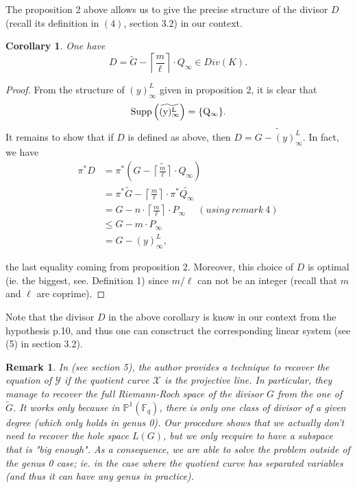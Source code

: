 \documentclass[10pt]{article}
\newtheorem{coro1}{Corollary}[]
\newtheorem{rq1}{Remark}[]
\newcommand{\s}{\vspace{0.3cm}}
\newcommand{\cd}{\cdot}
\newcommand{\fq}{\mathbb{F}_q}
\newcommand{\X}{\mathcal{X}}
\newcommand{\Y}{\mathcal{Y}}
\begin{document}
\s

The proposition 2 above allows us to give the precise structure of the divisor $D$ (recall its definition in $(4)$, section 3.2) in our context.

\s

\begin{coro1}
One have
\[D = \tilde{G} - \left\lceil\frac{m}{\ell}\right\rceil \cd Q_{\infty} \in Div(K).\]
\end{coro1}

\s

\begin{proof}
From the structure of $(y)^L_{\infty}$ given in proposition 2, it is clear that 
\[\rm{Supp}\left(\widetilde{(y)^L_{\infty}}\right) = \{Q_{\infty}\}.\]
It remains to show that if $D$ is defined as above, then $D = \widetilde{G - (y)^L_{\infty}}$. In fact, we have
\begin{align*}
\pi^*D &= \pi^* \left(\widetilde{G - \left\lceil\frac{m}{\ell}\right\rceil \cd Q_{\infty}}\right) \\
&= \pi^*\tilde{G} - \left\lceil\frac{m}{\ell}\right\rceil \cd \pi^*\widetilde{Q_{\infty}} \\
&= G - n \cd \left\lceil\frac{m}{\ell}\right\rceil \cd P_{\infty} \ \quad (using \ remark \ 4) \\
& \leq G - m \cd P_{\infty} \\
&= G-(y)^L_{\infty},
\end{align*}

the last equality coming from proposition 2. Moreover, this choice of $D$ is optimal (ie. the biggest, see. Definition 1) since $m/\ell$ can not be an integer (recall that $m$ and $\ell$ are coprime).
\end{proof}

\s

Note that the divisor $D$ in the above corollary is know in our context from the hypothesis p.10, and thus one can consctruct the corresponding linear system (see (5) in section 3.2).

\s

\begin{rq1} \rm
In \cite{Bar} (see section 5), the author provides a technique to recover the equation of $\Y$ if the quotient curve $\X$ is the projective line. In particular, they manage to recover the full Riemann-Roch space of the divisor $G$ from the one of $\tilde{G}$. It works only because in $\mathbb{P}^1(\fq)$, there is only one class of divisor of a given degree (which only holds in genus 0). Our procedure shows that we actually don't need to recover the hole space $L(G)$, but we only recquire to have a subspace that is "big enough". As a consequence, we are able to solve the problem outside of the genus 0 case; ie. in the case where the quotient curve has separated variables (and thus it can have any genus in practice).
\end{rq1}
\end{document}
